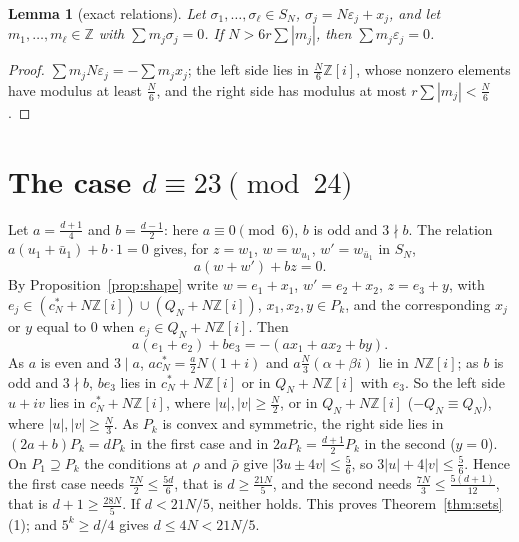 \documentclass[11pt,a4paper]{amsart}
\newtheorem{lemma}[theorem]{Lemma}
\theoremstyle{remark}
\newcommand{\Z}{\mathbb{Z}}
\begin{document}
\begin{lemma}[exact relations]\label{lem:exact}
Let $\sigma_1,\dots,\sigma_\ell\in S_N$, $\sigma_j=N\varepsilon_j+x_j$, and let $m_1,\dots,m_\ell\in\Z$ with
$\sum m_j\sigma_j=0$. If
$N>6r\sum|m_j|$, then $\sum m_j\varepsilon_j=0$.
\end{lemma}

\begin{proof}
$\sum m_jN\varepsilon_j=-\sum m_jx_j$; the left side lies in $\frac N6\Z[i]$, whose nonzero elements have modulus
at least $\frac N6$, and the right side has modulus at most $r\sum|m_j|<\frac N6$.
\end{proof}

\section{The case \texorpdfstring{$d\equiv23\pmod{24}$}{d = 23 mod 24}}\label{sec:23}

Let $a=\frac{d+1}4$ and $b=\frac{d-1}2$: here $a\equiv0\pmod6$, $b$ is odd and $3\nmid b$. The relation
$a(u_1+\bar u_1)+b\cdot1=0$ gives, for $z=w_1$, $w=w_{u_1}$, $w'=w_{\bar u_1}$ in $S_N$,
\[
a(w+w')+bz=0.
\]
By Proposition~\ref{prop:shape} write $w=e_1+x_1$, $w'=e_2+x_2$, $z=e_3+y$, with
$e_j\in(c^*_N+N\Z[i])\cup(Q_N+N\Z[i])$, $x_1,x_2,y\in P_k$, and the corresponding $x_j$ or $y$ equal to $0$ when
$e_j\in Q_N+N\Z[i]$. Then
\[
a(e_1+e_2)+be_3=-(ax_1+ax_2+by).
\]
As $a$ is even and $3\mid a$, $ac^*_N=\frac a2N(1+i)$ and $a\frac N3(\alpha+\beta i)$ lie in $N\Z[i]$; as $b$ is odd
and $3\nmid b$, $be_3$ lies in $c^*_N+N\Z[i]$ or in $Q_N+N\Z[i]$ with $e_3$. So the left side $u+iv$ lies in
$c^*_N+N\Z[i]$, where $|u|,|v|\ge\frac N2$, or in $Q_N+N\Z[i]$ ($-Q_N\equiv Q_N$), where $|u|,|v|\ge\frac N3$. As
$P_k$ is convex and symmetric, the right side lies in $(2a+b)P_k=dP_k$ in the first case and in
$2aP_k=\frac{d+1}2P_k$ in the second ($y=0$). On $P_1\supseteq P_k$ the conditions at $\rho$ and $\bar\rho$ give
$|3u\pm4v|\le\frac56$, so $3|u|+4|v|\le\frac56$. Hence the first case needs $\frac{7N}2\le\frac{5d}6$, that is
$d\ge\frac{21N}5$, and the second needs $\frac{7N}3\le\frac{5(d+1)}{12}$, that is $d+1\ge\frac{28N}5$. If
$d<21N/5$, neither holds. This proves Theorem~\ref{thm:sets}(1); and $5^k\ge d/4$ gives $d\le4N<21N/5$.
\end{document}
